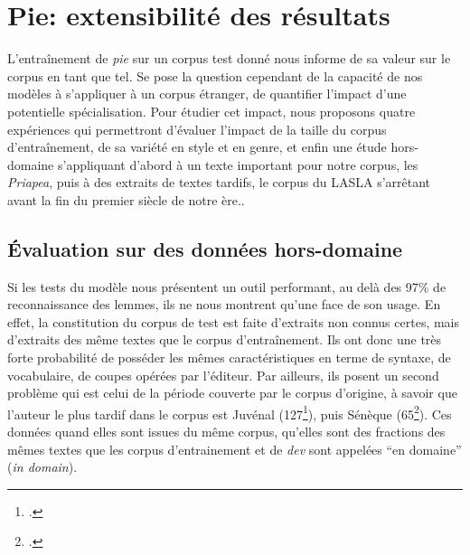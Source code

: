 \section{Pie: extensibilité des résultats}

L'entraînement de \textit{pie} sur un corpus test donné nous informe de sa valeur sur le corpus en tant que tel. Se pose la question cependant de la capacité de nos modèles à s'appliquer à un corpus étranger, de quantifier l'impact d'une potentielle spécialisation. Pour étudier cet impact, nous proposons quatre expériences qui permettront d'évaluer l'impact de la taille du corpus d'entraînement, de sa variété en style et en genre, et enfin une étude hors-domaine s'appliquant d'abord à un texte important pour notre corpus, les \textit{Priapea}, puis à des extraits de textes tardifs, le corpus du LASLA s'arrêtant avant la fin du premier siècle de notre ère..

\subsection{Évaluation sur des données hors-domaine}
\label{subsec:lemmatisation:hors-domaine}

Si les tests du modèle nous présentent un outil performant, au delà des 97\% de reconnaissance des lemmes, ils ne nous montrent qu'une face de son usage. En effet, la constitution du corpus de test est faite d'extraits non connus certes, mais d'extraits des même textes que le corpus d'entraînement. Ils ont donc une très forte probabilité de posséder les mêmes caractéristiques en terme de syntaxe, de vocabulaire, de coupes opérées par l'éditeur. Par ailleurs, ils posent un second problème qui est celui de la période couverte par le corpus d'origine, à savoir que l'auteur le plus tardif dans le corpus est Juvénal (127\footcite[p. 320]{fredouille}), puis Sénèque (65\footcite[p. 231]{fredouille}). Ces données quand elles sont issues du même corpus, qu'elles sont des fractions des mêmes textes que les corpus d'entrainement et de \textit{dev} sont appelées \enquote{en domaine} (\textit{in domain}).

